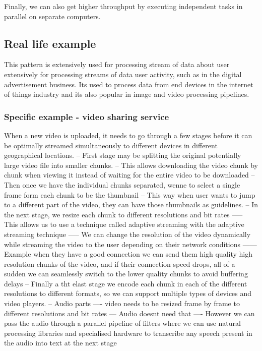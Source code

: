 \documentclass[a4paper, 11pt]{book}
\begin{document}
    Finally, we can also get higher throughput by executing independent tasks in parallel on separate computers.

    \subsection{Real life example}
    This pattern is extensively used for processing stream of data about user extensively for processing streams of data user activity, such as in the digital advertisement business.
    Its used to process data from end devices in the internet of things industry and its also popular in image and video processing pipelines.

    \subsubsection{Specific example - video sharing service}
    When a new video is uploaded, it needs to go through a few stages before it can be optimally streamed simultaneously to different devices in different geographical locations.
    -- First stage may be splitting the original potentially large video file into smaller chunks.
    -- This allows downloading the video chunk by chunk when viewing it instead of waiting for the entire video to be downloaded
    -- Then once we have the individual chunks separated, wenne to select a single frame form each chunk to be the thumbnail
    -- This way when user wants to jump to a different part of the video, they can have those thumbnails as guidelines.
    -- In the next stage, we resize each chunk to different resolutions and bit rates
    ----- This allows us to use a technique called adaptive streaming with the adaptive streaming technique
    ----- We can change the resolution of the video dynamically while streaming the video to the user depending on their network conditions
    ------ Example when they have a good connection we can send them high quality high resolution chunks of the video, and if their connection speed drops, all of a sudden we can seamlessly switch to the lower quality chunks to avoid buffering delays
    -- Finally a tht elast stage we encode each chunk in each of the different resolutions to different formats, so we can support multiple types of devices and video players.
    -- Audio parts
    ---- video needs to be resized frame by frame to different resolutions and bit rates
    --- Audio doesnt need that
    ---- However we can pass the audio through a parallel pipeline of filters where we can use natural processing libraries and specialised hardware to transcribe any speech present in the audio into text at the next stage
\end{document}

